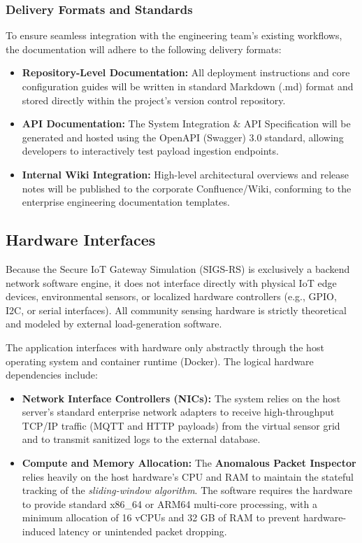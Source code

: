 \documentclass[12pt,letterpaper]{article}
\begin{document}
\subsubsection{Delivery Formats and Standards}
To ensure seamless integration with the engineering team's existing workflows, the documentation will adhere to the following delivery formats:\par
\begin{itemize}
\item \textbf{Repository-Level Documentation:} All deployment instructions and core configuration guides will be written in standard Markdown (.md) format and stored directly within the project's version control repository.
\item \textbf{API Documentation:} The System Integration \& API Specification will be generated and hosted using the OpenAPI (Swagger) 3.0 standard, allowing developers to interactively test payload ingestion endpoints.
\item \textbf{Internal Wiki Integration:} High-level architectural overviews and release notes will be published to the corporate Confluence/Wiki, conforming to the enterprise engineering documentation templates.
\end{itemize}
\vspace{0.08in}
\subsection{Hardware Interfaces}
Because the Secure IoT Gateway Simulation (SIGS-RS) is exclusively a backend network software engine, it does not interface directly with physical IoT edge devices, environmental sensors, or localized hardware controllers (e.g., GPIO, I2C, or serial interfaces). All community sensing hardware is strictly theoretical and modeled by external load-generation software.

The application interfaces with hardware only abstractly through the host operating system and container runtime (Docker). The logical hardware dependencies include:

\begin{itemize}
\item \textbf{Network Interface Controllers (NICs):} The system relies on the host server's standard enterprise network adapters to receive high-throughput TCP/IP traffic (MQTT and HTTP payloads) from the virtual sensor grid and to transmit sanitized logs to the external database.
\item \textbf{Compute and Memory Allocation:} The \textbf{Anomalous Packet Inspector} relies heavily on the host hardware's CPU and RAM to maintain the stateful tracking of the \emph{sliding-window algorithm}. The software requires the hardware to provide standard x86\_64 or ARM64 multi-core processing, with a minimum allocation of 16 vCPUs and 32 GB of RAM to prevent hardware-induced latency or unintended packet dropping.
\end{itemize}
\end{document}
